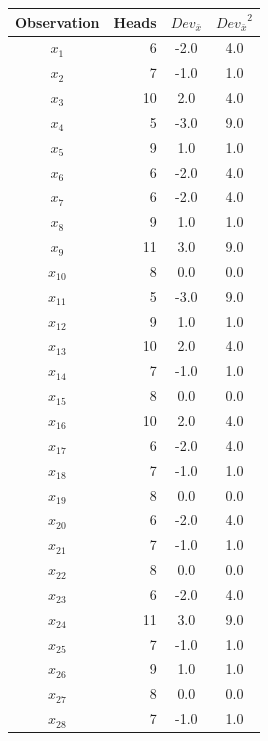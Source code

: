 \documentclass[nohyper,justified]{tufte-handout}\usepackage[]{graphicx}\usepackage[]{color}
\newcommand{\dev}[1] {Dev_{\bar{#1}}}
\begin{document}
\begin{table}[ht]
\centering
\begin{tabular}{cr|c|c|}
  \toprule
Observation & Heads & $\dev{x}$ & ${\dev{x}}^2$ \\ 
  \midrule
$x_{1}$ & 6 & -2.0 & 4.0 \\ 
   \rowcolor[gray]{0.95}$x_{2}$ & 7 & -1.0 & 1.0 \\ 
  $x_{3}$ & 10 & 2.0 & 4.0 \\ 
   \rowcolor[gray]{0.95}$x_{4}$ & 5 & -3.0 & 9.0 \\ 
  $x_{5}$ & 9 & 1.0 & 1.0 \\ 
   \rowcolor[gray]{0.95}$x_{6}$ & 6 & -2.0 & 4.0 \\ 
  $x_{7}$ & 6 & -2.0 & 4.0 \\ 
   \rowcolor[gray]{0.95}$x_{8}$ & 9 & 1.0 & 1.0 \\ 
  $x_{9}$ & 11 & 3.0 & 9.0 \\ 
   \rowcolor[gray]{0.95}$x_{10}$ & 8 & 0.0 & 0.0 \\ 
  $x_{11}$ & 5 & -3.0 & 9.0 \\ 
   \rowcolor[gray]{0.95}$x_{12}$ & 9 & 1.0 & 1.0 \\ 
  $x_{13}$ & 10 & 2.0 & 4.0 \\ 
   \rowcolor[gray]{0.95}$x_{14}$ & 7 & -1.0 & 1.0 \\ 
  $x_{15}$ & 8 & 0.0 & 0.0 \\ 
   \rowcolor[gray]{0.95}$x_{16}$ & 10 & 2.0 & 4.0 \\ 
  $x_{17}$ & 6 & -2.0 & 4.0 \\ 
   \rowcolor[gray]{0.95}$x_{18}$ & 7 & -1.0 & 1.0 \\ 
  $x_{19}$ & 8 & 0.0 & 0.0 \\ 
   \rowcolor[gray]{0.95}$x_{20}$ & 6 & -2.0 & 4.0 \\ 
  $x_{21}$ & 7 & -1.0 & 1.0 \\ 
   \rowcolor[gray]{0.95}$x_{22}$ & 8 & 0.0 & 0.0 \\ 
  $x_{23}$ & 6 & -2.0 & 4.0 \\ 
   \rowcolor[gray]{0.95}$x_{24}$ & 11 & 3.0 & 9.0 \\ 
  $x_{25}$ & 7 & -1.0 & 1.0 \\ 
   \rowcolor[gray]{0.95}$x_{26}$ & 9 & 1.0 & 1.0 \\ 
  $x_{27}$ & 8 & 0.0 & 0.0 \\ 
   \rowcolor[gray]{0.95}$x_{28}$ & 7 & -1.0 & 1.0 \\ 

\end{tabular}
\end{table}
\end{document}
